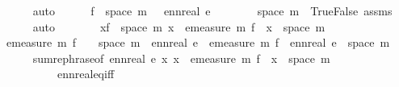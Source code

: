 \begin{isabellebody}
\ \ \ \ \ \ \isamarkupfalse%
\ auto\isanewline
\ \ \ \ \isamarkupfalse%
\ {\isachardoublequoteopen}f\ {\isacharbackquote}{\kern0pt}\ space\ m\ {\isacharequal}{\kern0pt}\ {\isacharbraceleft}{\kern0pt}{}{\isacharcomma}{\kern0pt}\ ennreal\ e{\isacharbraceright}{\kern0pt}{\isachardoublequoteclose}\isanewline
\ \ \ \ \ \ \isamarkupfalse%
\ {\isacartoucheopen}space\ m\ {\isacharequal}{\kern0pt}\ {\isacharbraceleft}{\kern0pt}True{\isacharcomma}{\kern0pt}False{\isacharbraceright}{\kern0pt}{\isacartoucheclose}\ assms{\isacharparenleft}{\kern0pt}{}{\isacharparenright}{\kern0pt}\isanewline
\ \ \ \ \ \ \isamarkupfalse%
\ auto\isanewline
\ \ \ \ \isamarkupfalse%
\ \isamarkupfalse%
\ {\isachardoublequoteopen}{\isacharparenleft}{\kern0pt}{\isasymSum}x{\isasymin}f\ {\isacharbackquote}{\kern0pt}\ space\ m{\isachardot}{\kern0pt}\ x\ {\isacharasterisk}{\kern0pt}\ emeasure\ m\ {\isacharparenleft}{\kern0pt}f\ {\isacharminus}{\kern0pt}{\isacharbackquote}{\kern0pt}\ {\isacharbraceleft}{\kern0pt}x{\isacharbraceright}{\kern0pt}\ {\isasyminter}\ space\ m{\isacharparenright}{\kern0pt}{\isacharparenright}{\kern0pt}\isanewline
{\isacharequal}{\kern0pt}\ {}\ {\isacharasterisk}{\kern0pt}\ emeasure\ m\ {\isacharparenleft}{\kern0pt}f\ {\isacharminus}{\kern0pt}{\isacharbackquote}{\kern0pt}\ {\isacharbraceleft}{\kern0pt}{}{\isacharbraceright}{\kern0pt}\ {\isasyminter}\ space\ m{\isacharparenright}{\kern0pt}\ {\isacharplus}{\kern0pt}\ ennreal\ e\ {\isacharasterisk}{\kern0pt}\ emeasure\ m\ {\isacharparenleft}{\kern0pt}f\ {\isacharminus}{\kern0pt}{\isacharbackquote}{\kern0pt}\ {\isacharbraceleft}{\kern0pt}ennreal\ e{\isacharbraceright}{\kern0pt}\ {\isasyminter}\ space\ m{\isacharparenright}{\kern0pt}{\isachardoublequoteclose}\isanewline
\ \ \ \ \ \ \isamarkupfalse%
\ sum{\isacharunderscore}{\kern0pt}rephrase{\isacharbrackleft}{\kern0pt}of\ {\isachardoublequoteopen}ennreal\ e{\isachardoublequoteclose}\ {\isachardoublequoteopen}{\isasymlambda}x{\isachardot}{\kern0pt}\ x\ {\isacharasterisk}{\kern0pt}\ emeasure\ m\ {\isacharparenleft}{\kern0pt}f\ {\isacharminus}{\kern0pt}{\isacharbackquote}{\kern0pt}\ {\isacharbraceleft}{\kern0pt}x{\isacharbraceright}{\kern0pt}\ {\isasyminter}\ space\ m{\isacharparenright}{\kern0pt}{\isachardoublequoteclose}{\isacharbrackright}{\kern0pt}\ \isanewline
\ \ \ \ \ \ \ \ \ \ \ \ ennreal{\isacharunderscore}{\kern0pt}eq{\isacharunderscore}{\kern0pt}{}{\isacharunderscore}{\kern0pt}iff\isanewline

\end{isabellebody}
